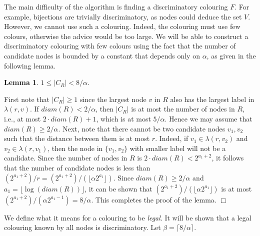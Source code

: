 \documentclass[11pt]{article}
\newtheorem{lemma}{Lemma}[section]
\newcommand{\qed}{\hfill $\Box$ \bigbreak}
\newenvironment{proof}{\noindent {\bf Proof.}}{\qed}
\newcommand{\diam}[1]{\ensuremath{{diam}(#1)}}
\newcommand{\candidates}[1]{\ensuremath{C_{#1}}}
\newcommand{\maxcandidates}{\ensuremath{\beta}}
\newcommand{\maxcandidatesval}{\ensuremath{\lceil8/\alpha\rceil}}
\begin{document}
The main difficulty of the algorithm is finding  a discriminatory colouring $F$. 
For example, bijections are trivially discriminatory, as nodes could deduce the set $V$.
However, we cannot use such a colouring. Indeed, the colouring must use few colours, otherwise the advice would be too large.
We will be able to construct a discriminatory colouring with few colours  using the fact that the number of candidate nodes is bounded by a constant that depends only on $\alpha$, as given in the following lemma. 



\begin{lemma}\label{boundcandidates}
$1 \leq |\candidates{R}| <8/\alpha$.
\end{lemma}
\begin{proof}
First note that $|\candidates{R}| \geq 1$ since the largest node $v$ in $R$ also has the largest label in $\lambda(r,v)$. 
If $\diam{R}<2/\alpha$, then $|C_R|$ is at most the number of nodes in $R$, i.e., at most $2\cdot diam(R) +1$, which is at most $5/\alpha$. Hence we may assume that $\diam{R}\geq 2/\alpha$.
Next, note that there cannot be two candidate nodes $v_1,v_2$ such that the distance between them is at most $r$. Indeed, if $v_1 \in \lambda(r,v_2)$ and $v_2 \in \lambda(r,v_1)$, then the node in $\{v_1,v_2\}$ with smaller label will not be a candidate. Since the number of nodes in $R$ is $2\cdot \diam{R} < 2^{a_1+2}$, it follows that the number of candidate nodes is less than $(2^{a_1+2})/r = (2^{a_1+2})/(\lfloor \alpha 2^{a_1} \rfloor)$. 
Since $diam(R) \geq 2/\alpha$ and $a_1=\lfloor\log(\diam{R})\rfloor$, it can be shown that $(2^{a_1+2})/(\lfloor \alpha 2^{a_1} \rfloor)$ is at most $(2^{a_1+2})/( \alpha 2^{a_1-1})=8/\alpha$. This completes the proof of the lemma.
\end{proof}



We define what it means for a colouring to be \emph{legal}. 
It will be shown that a legal colouring known by all nodes is discriminatory. Let $\maxcandidates = \maxcandidatesval$. 
\end{document}
